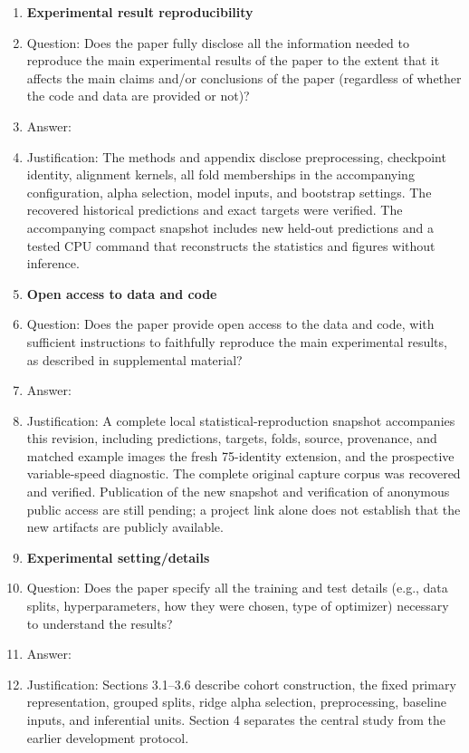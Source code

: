 \begin{enumerate}
    \item {\bf Experimental result reproducibility}
    \item[] Question: Does the paper fully disclose all the information needed to reproduce the main experimental results of the paper to the extent that it affects the main claims and/or conclusions of the paper (regardless of whether the code and data are provided or not)?
    \item[] Answer: \answerYes{}
    \item[] Justification: The methods and appendix disclose preprocessing, checkpoint identity, alignment kernels, all fold memberships in the accompanying configuration, alpha selection, model inputs, and bootstrap settings. The recovered historical predictions and exact targets were verified. The accompanying compact snapshot includes new held-out predictions and a tested CPU command that reconstructs the statistics and figures without inference.


\item {\bf Open access to data and code}
    \item[] Question: Does the paper provide open access to the data and code, with sufficient instructions to faithfully reproduce the main experimental results, as described in supplemental material?
    \item[] Answer: \answerNo{}
    \item[] Justification: A complete local statistical-reproduction snapshot accompanies this revision, including predictions, targets, folds, source, provenance, and matched example images the fresh 75-identity extension, and the prospective variable-speed diagnostic. The complete original capture corpus was recovered and verified. Publication of the new snapshot and verification of anonymous public access are still pending; a project link alone does not establish that the new artifacts are publicly available.


\item {\bf Experimental setting/details}
    \item[] Question: Does the paper specify all the training and test details (e.g., data splits, hyperparameters, how they were chosen, type of optimizer) necessary to understand the results?
    \item[] Answer: \answerYes{}
    \item[] Justification: Sections 3.1--3.6 describe cohort construction, the fixed primary representation, grouped splits, ridge alpha selection, preprocessing, baseline inputs, and inferential units. Section 4 separates the central study from the earlier development protocol.



\end{enumerate}
